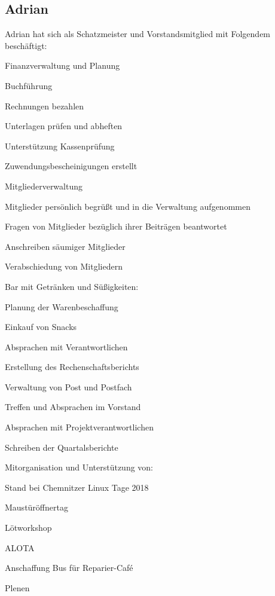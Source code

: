 \documentclass[ngerman]{scrartcl}
\begin{document}
\subsection{Adrian}
Adrian hat sich als Schatzmeister und Vorstandsmitglied mit Folgendem beschäftigt:
\begin{compactitem}
	\item Finanzverwaltung und Planung
	\begin{compactitem}
		\item Buchführung
		\item Rechnungen bezahlen
		\item Unterlagen prüfen und abheften
		\item Unterstützung Kassenprüfung
		\item Zuwendungsbescheinigungen erstellt
	\end{compactitem}
	\item Mitgliederverwaltung
	\begin{compactitem}
		\item Mitglieder persönlich begrüßt und in die Verwaltung aufgenommen
		\item Fragen von Mitglieder bezüglich ihrer Beiträgen beantwortet
		\item Anschreiben säumiger Mitglieder
		\item Verabschiedung von Mitgliedern
	\end{compactitem}
	\item Bar mit Getränken und Süßigkeiten:
	\begin{compactitem}
		\item Planung der Warenbeschaffung
		\item Einkauf von Snacks
		\item Absprachen mit Verantwortlichen
	\end{compactitem}
	\item Erstellung des Rechenschaftsberichts
	\item Verwaltung von Post und Postfach
	\item Treffen und Absprachen im Vorstand
	\item Absprachen mit Projektverantwortlichen
	\item Schreiben der Quartalsberichte
	\item Mitorganisation und Unterstützung von:
	\begin{compactitem}
		\item Stand bei Chemnitzer Linux Tage 2018
		\item Maustüröffnertag
		\item Lötworkshop
		\item ALOTA
		\item Anschaffung Bus für Reparier-Café
		\item Plenen
	\end{compactitem}
	
\end{compactitem}
\end{document}
